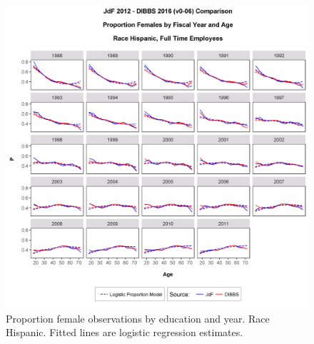 \documentclass[10pt, letterpaper]{article}
\begin{document}
\begin{spacing}{1.0}
\begin{figure}[]
    \centering
    \includegraphics[width=6.5in, trim={0 0 0 1in}, clip]{GenderProportionLogisticModelFYRaceAgeDv0-06.png}
    \caption{Proportion female observations by education and year.  Race Hispanic.  Fitted lines are logistic regression estimates.}
    \label{figure:GenderProportionLogisticModelFYRaceAgeD}
\end{figure}

\clearpage


\end{spacing}
\end{document}
